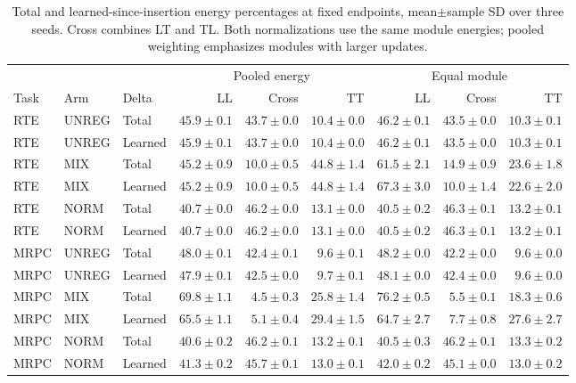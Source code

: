 \documentclass{article}
\begin{document}
\begin{table}[t]
\centering
\caption{Total and learned-since-insertion energy percentages at fixed endpoints, mean$\pm$sample SD over three seeds. Cross combines LT and TL. Both normalizations use the same module energies; pooled weighting emphasizes modules with larger updates.}
\label{tab:learnedplacement}
\begin{adjustbox}{max width=\linewidth}
\begin{tabular}{lllrrrrrr}
\toprule
&&&\multicolumn{3}{c}{Pooled energy}&\multicolumn{3}{c}{Equal module}\\
Task & Arm & Delta & LL & Cross & TT & LL & Cross & TT\\
\midrule
RTE & UNREG & Total & $45.9 \pm 0.1$ & $43.7 \pm 0.0$ & $10.4 \pm 0.0$ & $46.2 \pm 0.1$ & $43.5 \pm 0.0$ & $10.3 \pm 0.1$ \\
RTE & UNREG & Learned & $45.9 \pm 0.1$ & $43.7 \pm 0.0$ & $10.4 \pm 0.0$ & $46.2 \pm 0.1$ & $43.5 \pm 0.0$ & $10.3 \pm 0.1$ \\
RTE & MIX & Total & $45.2 \pm 0.9$ & $10.0 \pm 0.5$ & $44.8 \pm 1.4$ & $61.5 \pm 2.1$ & $14.9 \pm 0.9$ & $23.6 \pm 1.8$ \\
RTE & MIX & Learned & $45.2 \pm 0.9$ & $10.0 \pm 0.5$ & $44.8 \pm 1.4$ & $67.3 \pm 3.0$ & $10.0 \pm 1.4$ & $22.6 \pm 2.0$ \\
RTE & NORM & Total & $40.7 \pm 0.0$ & $46.2 \pm 0.0$ & $13.1 \pm 0.0$ & $40.5 \pm 0.2$ & $46.3 \pm 0.1$ & $13.2 \pm 0.1$ \\
RTE & NORM & Learned & $40.7 \pm 0.0$ & $46.2 \pm 0.0$ & $13.1 \pm 0.0$ & $40.5 \pm 0.2$ & $46.3 \pm 0.1$ & $13.2 \pm 0.1$ \\
\midrule
MRPC & UNREG & Total & $48.0 \pm 0.1$ & $42.4 \pm 0.1$ & $9.6 \pm 0.1$ & $48.2 \pm 0.0$ & $42.2 \pm 0.0$ & $9.6 \pm 0.0$ \\
MRPC & UNREG & Learned & $47.9 \pm 0.1$ & $42.5 \pm 0.0$ & $9.7 \pm 0.1$ & $48.1 \pm 0.0$ & $42.4 \pm 0.0$ & $9.6 \pm 0.0$ \\
MRPC & MIX & Total & $69.8 \pm 1.1$ & $4.5 \pm 0.3$ & $25.8 \pm 1.4$ & $76.2 \pm 0.5$ & $5.5 \pm 0.1$ & $18.3 \pm 0.6$ \\
MRPC & MIX & Learned & $65.5 \pm 1.1$ & $5.1 \pm 0.4$ & $29.4 \pm 1.5$ & $64.7 \pm 2.7$ & $7.7 \pm 0.8$ & $27.6 \pm 2.7$ \\
MRPC & NORM & Total & $40.6 \pm 0.2$ & $46.2 \pm 0.1$ & $13.2 \pm 0.1$ & $40.5 \pm 0.3$ & $46.2 \pm 0.1$ & $13.3 \pm 0.2$ \\
MRPC & NORM & Learned & $41.3 \pm 0.2$ & $45.7 \pm 0.1$ & $13.0 \pm 0.1$ & $42.0 \pm 0.2$ & $45.1 \pm 0.0$ & $13.0 \pm 0.2$ \\
\bottomrule
\end{tabular}
\end{adjustbox}
\end{table}
\end{document}
